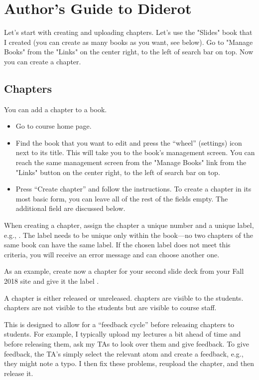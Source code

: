 \chapter{Author's Guide to Diderot}
\label{ch:guide}

%

Let's start with creating and uploading chapters.  Let's use the
"Slides" book that I created (you can create as many books as you
want, see below).  Go to "Manage Books" from the "Links" on the center
right, to the left of search bar on top.  Now you can create a
chapter.  

\section{Chapters}
\label{guide:chapter}

\begin{gram}
\label{guide:chapter::create}
You can add a chapter to a book.  
\begin{itemize}
\item Go to course home page.
\item Find the book that you want to edit and press the ``wheel''
  (settings) icon next to its title.  This will take you to the book's
  management screen.  You can reach the same management screen from
  the "Manage Books" link from the "Links" button on the center right,
  to the left of search bar on top.

\item  Press ``Create chapter'' and follow the instructions.  To create a chapter in its most basic form, you can leave all of the rest of the fields empty.  The additional field are discussed below.
\end{itemize}
%

When creating a chapter, assign the chapter a unique number and a unique label, e.g., .  
%
The label needs to be unique only within the book---no two chapters of
the same book can have the same label.
%
If the chosen label does not meet this criteria, you will receive an error message and can choose another one.

As an example, create now a chapter for your second slide deck from
your Fall 2018 site and give it the label .
\end{gram}

\begin{gram}
A chapter is either released or unreleased. 
%
 chapters are visible to the students.
%
 chapters are not visible to the students but  are visible to course staff.  

This is designed to allow for a ``feedback cycle'' before releasing chapters to students.  
%
For example, I typically  upload my lectures a bit ahead of time and before releasing them, ask my TAs to look over them and give feedback.
%
To give feedback, the TA's simply select the relevant atom and create a feedback, e.g., they might note a typo.
%
I then fix these problems, reupload the chapter, and then release it.  
\end{gram}

